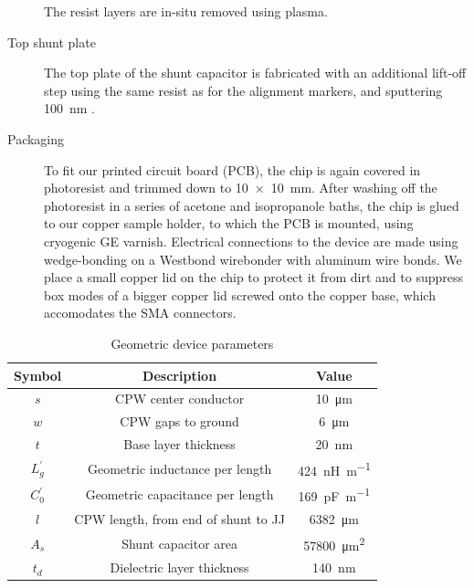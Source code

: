 \begin{description}
	The resist layers are in-situ removed using  plasma.
	\item[Top shunt plate] The top plate of the shunt capacitor is fabricated with an additional lift-off step using the same resist as for the alignment markers, and sputtering \SI{100}{\nano\meter} .
	\item[Packaging] To fit our printed circuit board (PCB), the chip is again covered in photoresist and trimmed down to \SI{10x10}{\milli\meter}.
	After washing off the photoresist in a series of acetone and isopropanole baths, the chip is glued to our copper sample holder, to which the PCB is mounted, using cryogenic GE varnish.
	Electrical connections to the device are made using wedge-bonding on a Westbond wirebonder with aluminum wire bonds.
	We place a small copper lid on the chip to protect it from dirt and to suppress box modes of a bigger copper lid screwed onto the copper base, which accomodates the SMA connectors.
\end{description}

\begin{table}
	\caption{Geometric device parameters\label{tab:geometry}}
	\begin{tabular}{ccc}
		\hline \hline
		Symbol       & Description                                                                 & Value                            \\
		\hline
		$s$          & CPW center conductor                                                        & \SI{10}{\micro\meter}            \\
		$w$          & CPW gaps to ground                                                          & \SI{6}{\micro\meter}             \\
		$t$          & Base layer thickness                                                        & \SI{20}{\nano\meter}             \\
		$L_g^\prime$ & Geometric inductance per length \cite{simonsCoplanarWaveguideCircuits2001}  & \SI{424}{\nano\henry\per\meter}  \\
		$C_0^\prime$ & Geometric capacitance per length \cite{simonsCoplanarWaveguideCircuits2001} & \SI{169}{\pico\farad\per\meter}  \\
		$l$          & CPW length, from end of shunt to JJ                                         & \SI{6382}{\micro\meter}          \\
		$A_s$        & Shunt capacitor area                                                        & \SI{57800}{\micro\meter\squared} \\
		$t_d$        & Dielectric layer thickness                                                  & \SI{140}{\nano\meter}            \\
		\hline\hline
	\end{tabular}
\end{table}

